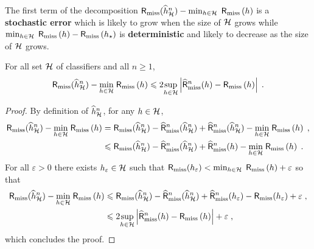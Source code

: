The first term of the decomposition $\mathsf{R}_{\mathrm{miss}}(\widehat h^n_{\mathcal{H}}) - \min_{h\in\mathcal{H}}\; \mathsf{R}_{\mathrm{miss}}\left(h\right)$ is a \textbf{stochastic error} which is likely to grow when the size of $\mathcal{H}$ grows while $\min_{h\in\mathcal{H}}\; \mathsf{R}_{\mathrm{miss}}\left(h\right)  -  \mathsf{R}_{\mathrm{miss}}\left(h_{\star}\right)$ is \textbf{deterministic} and likely to decrease as the size of $\mathcal{H}$ grows.
\begin{shaded}
\begin{lemma}
\label{lem:missclassif:ub}
For all set $\mathcal{H}$ of classifiers and all $n\geqslant 1$,
\begin{equation}
\label{eq:stochError}
\mathsf{R}_{\mathrm{miss}}(\widehat h^n_{\mathcal{H}}) - \underset{h\in\mathcal{H}}{\min}\; \mathsf{R}_{\mathrm{miss}}\left(h\right) \leqslant 2 \underset{h\in\mathcal{H}}{\sup}\left|\widehat{\mathsf{R}}^n_{\mathrm{miss}}(h) - \mathsf{R}_{\mathrm{miss}}\left(h\right)\right| \;.
\end{equation}
\end{lemma}
\end{shaded}
\begin{proof}
By definition of $\widehat h^n_{\mathcal{H}}$, for any $h\in\mathcal{H}$,
\begin{align*}
\mathsf{R}_{\mathrm{miss}}(\widehat h^n_{\mathcal{H}}) - \underset{h\in\mathcal{H}}{\min}\; \mathsf{R}_{\mathrm{miss}}\left(h\right) &=  \mathsf{R}_{\mathrm{miss}}(\widehat h^n_{\mathcal{H}})  - \widehat {\mathsf{R}}^n_{\mathrm{miss}}(\widehat h^n_{\mathcal{H}}) + \widehat {\mathsf{R}}^n_{\mathrm{miss}}(\widehat h^n_{\mathcal{H}}) - \underset{h\in\mathcal{H}}{\min}\; \mathsf{R}_{\mathrm{miss}}\left(h\right)\;,\\
&\leqslant \mathsf{R}_{\mathrm{miss}}(\widehat h^n_{\mathcal{H}})  - \widehat {\mathsf{R}}^n_{\mathrm{miss}}(\widehat h^n_{\mathcal{H}}) + \widehat {\mathsf{R}}^n_{\mathrm{miss}}(h) - \underset{h\in\mathcal{H}}{\min}\; \mathsf{R}_{\mathrm{miss}}\left(h\right)\;.
\end{align*}
For all $\varepsilon>0$ there exists $h_{\varepsilon}\in\mathcal{H}$ such that  $\mathsf{R}_{\mathrm{miss}}(h_{\varepsilon})< \min_{h\in\mathcal{H}}\; \mathsf{R}_{\mathrm{miss}}\left(h\right) + \varepsilon$ so that
\begin{align*}
\mathsf{R}_{\mathrm{miss}}(\widehat h^n_{\mathcal{H}}) - \underset{h\in\mathcal{H}}{\min}\; \mathsf{R}_{\mathrm{miss}}\left(h\right) &\leqslant \mathsf{R}_{\mathrm{miss}}(\widehat h^n_{\mathcal{H}})  - \widehat {\mathsf{R}}^n_{\mathrm{miss}}(\widehat h^n_{\mathcal{H}}) + \widehat {\mathsf{R}}^n_{\mathrm{miss}}(h_{\varepsilon}) - \mathsf{R}_{\mathrm{miss}}(h_{\varepsilon}) + \varepsilon\;,\\
&\leqslant   2 \underset{h\in\mathcal{H}}{\sup}\left|\widehat {\mathsf{R}}^n_{\mathrm{miss}}(h) - \mathsf{R}_{\mathrm{miss}}\left(h\right)\right| + \varepsilon\;,
\end{align*}
which concludes the proof.
\end{proof}

